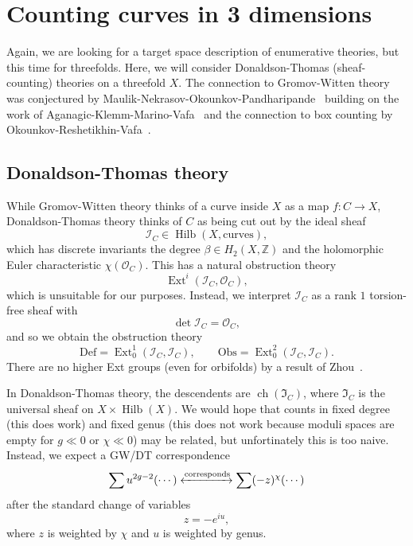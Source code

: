 \documentclass[leqno, openany]{memoir}
\theoremstyle{definition}
\theoremstyle{remark}
\theoremstyle{plain}
\theoremstyle{definition}
\theoremstyle{remark}
\newcommand{\Z}{\mathbb{Z}}
\newcommand{\mc}[1]{\mathcal{#1}}
\newcommand{\mf}[1]{\mathfrak{#1}}
\newcommand{\mr}[1]{\mathrm{#1}}
\DeclareMathOperator{\Ext}{Ext}
\DeclareMathOperator{\ch}{ch}
\DeclareMathOperator{\Hilb}{Hilb}
\begin{document}
\section{Counting curves in 3 dimensions}

Again, we are looking for a target space description of enumerative theories, but this time for threefolds. Here, we will consider Donaldson-Thomas (sheaf-counting) theories on a threefold $X$. The connection to Gromov-Witten theory was conjectured by Maulik-Nekrasov-Okounkov-Pandharipande~\cite{mnop1,mnop2} building on the work of Aganagic-Klemm-Marino-Vafa~\cite{vertexphys} and the connection to box counting by Okounkov-Reshetikhin-Vafa~\cite{crystals}.

\subsection{Donaldson-Thomas theory}

While Gromov-Witten theory thinks of a curve inside $X$ as a map $f \colon C \to X$, Donaldson-Thomas theory thinks of $C$ as being cut out by the ideal sheaf
\[ \mc{I}_C \in \Hilb(X, \mr{curves}), \]
which has discrete invariants the degree $\beta \in H_2(X, \Z)$ and the holomorphic Euler characteristic $\chi(\mc{O}_C)$. This has a natural obstruction theory
\[ \Ext^i(\mc{I}_C, \mc{O}_C), \]
which is unsuitable for our purposes. Instead, we interpret $\mc{I}_C$ as a rank $1$ torsion-free sheaf with 
\[ \det \mc{I}_C = \mc{O}_C, \]
and so we obtain the obstruction theory
\[ \mr{Def} = \Ext_0^1(\mc{I}_C, \mc{I}_C), \qquad \mr{Obs} = \Ext_0^2(\mc{I}_C, \mc{I}_C). \]
There are no higher Ext groups (even for orbifolds) by a result of Zhou~\cite{relorbdt}.

In Donaldson-Thomas theory, the descendents are $\ch(\mf{I}_C)$, where $\mf{I}_C$ is the universal sheaf on $X \times \Hilb(X)$. We would hope that counts in fixed degree (this does work) and fixed genus (this does not work because moduli spaces are empty for $g \ll 0$ or $\chi \ll 0$) may be related, but unfortinately this is too naive. Instead, we expect a GW/DT correspondence
\[ \sum u^{2g-2} (\cdots) \xleftrightarrow{\text{corresponds}} \sum (-z)^{\chi} (\cdots) \]
after the standard change of variables
\[ z = -e^{iu}, \]
where $z$ is weighted by $\chi$ and $u$ is weighted by genus.
\end{document}
